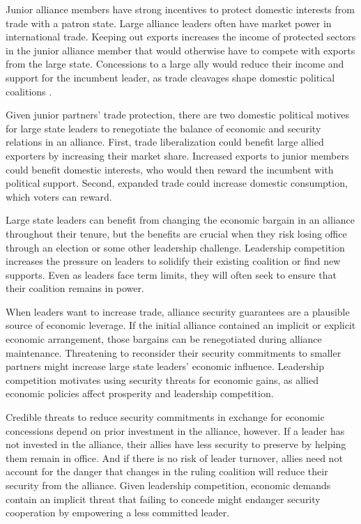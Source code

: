 \documentclass[12pt]{article}
\begin{document}
Junior alliance members have strong incentives to protect domestic interests from trade with a patron state. 
Large alliance leaders often have market power in international trade. 
Keeping out exports increases the income of protected sectors in the junior alliance member that would otherwise have to compete with exports from the large state.
Concessions to a large ally would reduce their income and support for the incumbent leader, as trade cleavages shape domestic political coalitions \citep{Rogowski1987, Hiscox2001}. 


Given junior partners' trade protection, there are two domestic political motives for large state leaders to renegotiate the balance of economic and security relations in an alliance. 
First, trade liberalization could benefit large allied exporters by increasing their market share.
Increased exports to junior members could benefit domestic interests, who would then reward the incumbent with political support. 
Second, expanded trade could increase domestic consumption, which voters can reward. 


%  
Large state leaders can benefit from changing the economic bargain in an alliance throughout their tenure, but the benefits are crucial when they risk losing office through an election or some other leadership challenge. 
Leadership competition increases the pressure on leaders to solidify their existing coalition or find new supports. 
Even as leaders face term limits, they will often seek to ensure that their coalition remains in power. 


When leaders want to increase trade, alliance security guarantees are a plausible source of economic leverage. 
If the initial alliance contained an implicit or explicit economic arrangement, those bargains can be renegotiated during alliance maintenance. 
Threatening to reconsider their security commitments to smaller partners might increase large state leaders' economic influence. 
Leadership competition motivates using security threats for economic gains, as allied economic policies affect prosperity and leadership competition. 


Credible threats to reduce security commitments in exchange for economic concessions depend on prior investment in the alliance, however. 
If a leader has not invested in the alliance, their allies have less security to preserve by helping them remain in office. 
And if there is no risk of leader turnover, allies need not account for the danger that changes in the ruling coalition will reduce their security from the alliance. 
Given leadership competition, economic demands contain an implicit threat that failing to concede might endanger security cooperation by empowering a less committed leader.
\end{document}
